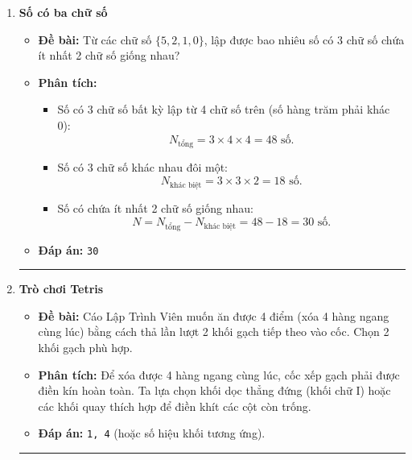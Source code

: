 \documentclass[11pt,a4paper]{article}
\begin{document}
\begin{enumerate}[label=\textbf{Câu \arabic*:}, leftmargin=*]
\hrule
\vspace{0.5cm}

\item \textbf{Số có ba chữ số}
    \begin{itemize}
        \item \textbf{Đề bài:} Từ các chữ số $\{5, 2, 1, 0\}$, lập được bao nhiêu số có 3 chữ số chứa ít nhất 2 chữ số giống nhau?
        \item \textbf{Phân tích:}
            \begin{itemize}
                \item Số có 3 chữ số bất kỳ lập từ 4 chữ số trên (số hàng trăm phải khác 0):
                    $$N_{\text{tổng}} = 3 \times 4 \times 4 = 48\text{ số}.$$
                \item Số có 3 chữ số khác nhau đôi một:
                    $$N_{\text{khác biệt}} = 3 \times 3 \times 2 = 18\text{ số}.$$
                \item Số có chứa ít nhất 2 chữ số giống nhau:
                    $$N = N_{\text{tổng}} - N_{\text{khác biệt}} = 48 - 18 = 30\text{ số}.$$
            \end{itemize}
        \item \textbf{Đáp án:} \texttt{30}
    \end{itemize}

\hrule
\vspace{0.5cm}

\item \textbf{Trò chơi Tetris}
    \begin{itemize}
        \item \textbf{Đề bài:} Cáo Lập Trình Viên muốn ăn được 4 điểm (xóa 4 hàng ngang cùng lúc) bằng cách thả lần lượt 2 khối gạch tiếp theo vào cốc. Chọn 2 khối gạch phù hợp.
        \item \textbf{Phân tích:}
            Để xóa được 4 hàng ngang cùng lúc, cốc xếp gạch phải được điền kín hoàn toàn. Ta lựa chọn khối dọc thẳng đứng (khối chữ I) hoặc các khối quay thích hợp để điền khít các cột còn trống.
        \item \textbf{Đáp án:} \texttt{1, 4} (hoặc số hiệu khối tương ứng).
    \end{itemize}

\hrule
\vspace{0.5cm}


\end{enumerate}
\end{document}
